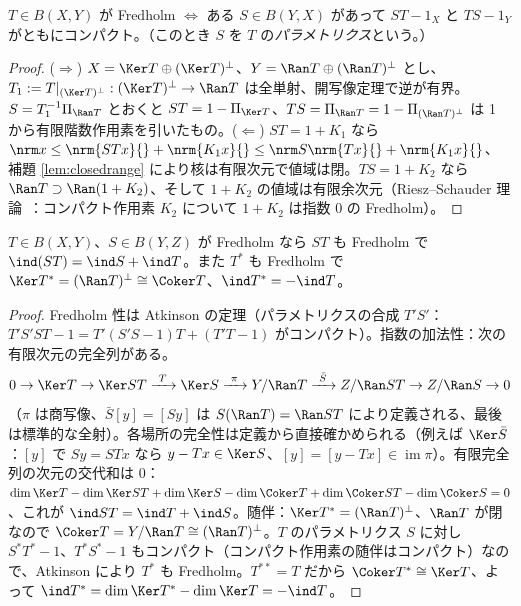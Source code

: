 \begin{thm}[Atkinson]\label{thm:atkinson}\tP
$T\in B(X,Y)$ が Fredholm $\iff$ ある $S\in B(Y,X)$ があって $ST-1_X$ と $TS-1_Y$ がともにコンパクト。（このとき $S$ を $T$ の\emph{パラメトリクス}という。）
\end{thm}
\begin{proof}
($\Rightarrow$) $X=\Ker T\oplus(\Ker T)^\perp$、$Y=\Ran T\oplus(\Ran T)^\perp$ とし、$T_1:=T|_{(\Ker T)^\perp}:(\Ker T)^\perp\to\Ran T$ は全単射、開写像定理で逆が有界。$S=T_1^{-1}\Pi_{\Ran T}$ とおくと $ST=1-\Pi_{\Ker T}$、$TS=\Pi_{\Ran T}=1-\Pi_{(\Ran T)^\perp}$ は 1 から有限階数作用素を引いたもの。($\Leftarrow$) $ST=1+K_1$ なら $\nrm x{}\le\nrm{STx}{}+\nrm{K_1x}{}\le\nrm S{}\nrm{Tx}{}+\nrm{K_1x}{}$、補題 \ref{lem:closedrange} により核は有限次元で値域は閉。$TS=1+K_2$ なら $\Ran T\supset\Ran(1+K_2)$、そして $1+K_2$ の値域は有限余次元（Riesz--Schauder 理論\tC\ ：コンパクト作用素 $K_2$ について $1+K_2$ は指数 $0$ の Fredholm）。
\end{proof}
\begin{prop}[合成と随伴]\label{prop:compose}\tP
$T\in B(X,Y)$、$S\in B(Y,Z)$ が Fredholm なら $ST$ も Fredholm で $\ind(ST)=\ind S+\ind T$。また $T^*$ も Fredholm で $\Ker T^*=(\Ran T)^\perp\cong\Coker T$、$\ind T^*=-\ind T$。
\end{prop}
\begin{proof}
Fredholm 性は Atkinson の定理（パラメトリクスの合成 $T'S'$：$T'S'ST-1=T'(S'S-1)T+(T'T-1)$ がコンパクト）。指数の加法性：次の有限次元の完全列がある。
\[
0\to\Ker T\to\Ker ST\xrightarrow{\ T\ }\Ker S\xrightarrow{\ \pi\ }Y/\Ran T\xrightarrow{\ \bar S\ }Z/\Ran ST\to Z/\Ran S\to0
\]
（$\pi$ は商写像、$\bar S[y]=[Sy]$ は $S(\Ran T)=\Ran ST$ により定義される、最後は標準的な全射）。各場所の完全性は定義から直接確かめられる（例えば $\Ker\bar S$：$[y]$ で $Sy=STx$ なら $y-Tx\in\Ker S$、$[y]=[y-Tx]\in\operatorname{im}\pi$）。有限完全列の次元の交代和は $0$：$\dim\Ker T-\dim\Ker ST+\dim\Ker S-\dim\Coker T+\dim\Coker ST-\dim\Coker S=0$、これが $\ind ST=\ind T+\ind S$。随伴：$\Ker T^*=(\Ran T)^\perp$、$\Ran T$ が閉なので $\Coker T=Y/\Ran T\cong(\Ran T)^\perp$。$T$ のパラメトリクス $S$ に対し $S^*T^*-1$、$T^*S^*-1$ もコンパクト（コンパクト作用素の随伴はコンパクト）なので、Atkinson により $T^*$ も Fredholm。$T^{**}=T$ だから $\Coker T^*\cong\Ker T$、よって $\ind T^*=\dim\Ker T^*-\dim\Ker T=-\ind T$。
\end{proof}

